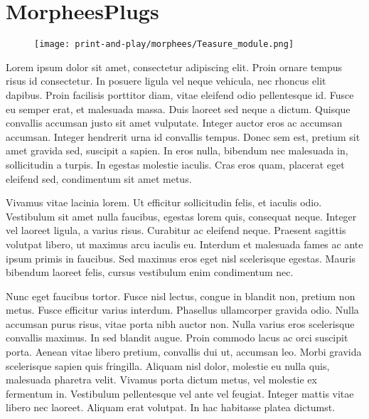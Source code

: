 \chapter{MorpheesPlugs} \label{ch:morphees}
  \begin{figure}[h]
    \centering
    \texttt{[image: print-and-play/morphees/Teasure\_module.png]}
  \end{figure}


  Lorem ipsum dolor sit amet, consectetur adipiscing elit. Proin ornare tempus
  risus id consectetur. In posuere ligula vel neque vehicula, nec rhoncus elit
  dapibus. Proin facilisis porttitor diam, vitae eleifend odio pellentesque id.
  Fusce eu semper erat, et malesuada massa. Duis laoreet sed neque a dictum.
  Quisque convallis accumsan justo sit amet vulputate. Integer auctor eros ac
  accumsan accumsan. Integer hendrerit urna id convallis tempus. Donec sem est,
  pretium sit amet gravida sed, suscipit a sapien. In eros nulla, bibendum nec
  malesuada in, sollicitudin a turpis. In egestas molestie iaculis. Cras eros
  quam, placerat eget eleifend sed, condimentum sit amet metus.

  Vivamus vitae lacinia lorem. Ut efficitur sollicitudin felis, et iaculis odio.
  Vestibulum sit amet nulla faucibus, egestas lorem quis, consequat neque.
  Integer vel laoreet ligula, a varius risus. Curabitur ac eleifend neque.
  Praesent sagittis volutpat libero, ut maximus arcu iaculis eu. Interdum et
  malesuada fames ac ante ipsum primis in faucibus. Sed maximus eros eget nisl
  scelerisque egestas. Mauris bibendum laoreet felis, cursus vestibulum enim
  condimentum nec.

  Nunc eget faucibus tortor. Fusce nisl lectus, congue in blandit non, pretium
  non metus. Fusce efficitur varius interdum. Phasellus ullamcorper gravida
  odio. Nulla accumsan purus risus, vitae porta nibh auctor non. Nulla varius
  eros scelerisque convallis maximus. In sed blandit augue. Proin commodo lacus
  ac orci suscipit porta. Aenean vitae libero pretium, convallis dui ut,
  accumsan leo. Morbi gravida scelerisque sapien quis fringilla. Aliquam nisl
  dolor, molestie eu nulla quis, malesuada pharetra velit. Vivamus porta dictum
  metus, vel molestie ex fermentum in. Vestibulum pellentesque vel ante vel
  feugiat. Integer mattis vitae libero nec laoreet. Aliquam erat volutpat. In
  hac habitasse platea dictumst.

